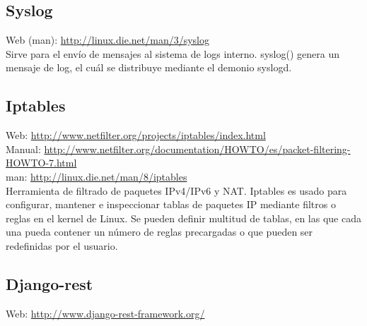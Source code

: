\subsection{Syslog}

Web (man): \url{http://linux.die.net/man/3/syslog}\\

Sirve para el envío de mensajes al sistema de logs interno. syslog() genera un mensaje de log, el cuál se distribuye mediante el demonio syslogd.

\subsection{Iptables}

Web: \url{http://www.netfilter.org/projects/iptables/index.html}\\
Manual: \url{http://www.netfilter.org/documentation/HOWTO/es/packet-filtering-HOWTO-7.html}\\
man: \url{http://linux.die.net/man/8/iptables}\\

Herramienta de filtrado de paquetes IPv4/IPv6 y NAT. Iptables es usado para configurar, mantener e inspeccionar tablas de paquetes IP mediante filtros o reglas en el kernel de Linux. Se pueden definir multitud de tablas, en las que cada una pueda contener un número de reglas precargadas o que pueden ser redefinidas por el usuario. \\

\subsection{Django-rest}


Web: \url{http://www.django-rest-framework.org/}

